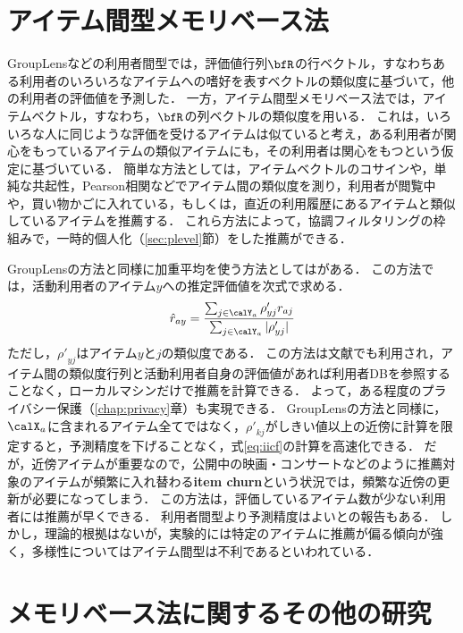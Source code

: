 \section{アイテム間型メモリベース法}
\label{sec:item-item}

GroupLensなどの利用者間型では，評価値行列$\bfR$の行ベクトル，すなわちある利用者のいろいろなアイテムへの嗜好を表すベクトルの類似度に基づいて，他の利用者の評価値を予測した．
一方，アイテム間型メモリベース法では，アイテムベクトル，すなわち，$\bfR$の列ベクトルの類似度を用いる．
これは，いろいろな人に同じような評価を受けるアイテムは似ていると考え，ある利用者が関心をもっているアイテムの類似アイテムにも，その利用者は関心をもつという仮定に基づいている．
簡単な方法としては，アイテムベクトルのコサイン\cite{ieeem:03:01}や，単純な共起性\cite{www:07:01}，Pearson相関などでアイテム間の類似度を測り，利用者が閲覧中や，買い物かごに入れている，もしくは，直近の利用履歴にあるアイテムと類似しているアイテムを推薦する．
これら方法によって，協調フィルタリングの枠組みで，一時的個人化（\ref{sec:plevel}節）をした推薦ができる．

GroupLensの方法と同様に加重平均を使う方法としては\cite{www:01:02}がある．
この方法では，活動利用者のアイテム$y$への推定評価値を次式で求める．
\begin{equation}
\hat{r}_{ay}=
\frac{\sum_{j\in\calY_a}\rho'_{yj}r_{aj}}{\sum_{j\in\calY_a}|\rho'_{yj}|}
\label{eq:iicf}
\end{equation}
ただし，${\rho'}_{yj}$はアイテム$y$と$j$の類似度である．
この方法は文献\cite{kdd:04:11}でも利用され，アイテム間の類似度行列と活動利用者自身の評価値があれば利用者DBを参照することなく，ローカルマシンだけで推薦を計算できる．
よって，ある程度のプライバシー保護（\ref{chap:privacy}章）も実現できる．
GroupLensの方法と同様に，$\calX_a$に含まれるアイテム全てではなく，${\rho'}_{kj}$がしきい値以上の近傍に計算を限定すると，予測精度を下げることなく，式\eqref{eq:iicf}の計算を高速化できる．
だが，近傍アイテムが重要なので，公開中の映画・コンサートなどのように推薦対象のアイテムが頻繁に入れ替わる\textbf{item churn}という状況では，頻繁な近傍の更新が必要になってしまう．
この方法は，評価しているアイテム数が少ない利用者には推薦が早くできる．
利用者間型より予測精度はよいとの報告もある．
しかし，理論的根拠はないが，実験的には特定のアイテムに推薦が偏る傾向が強く\cite{sigchi:06:01}，多様性についてはアイテム間型は不利であるといわれている．

\section{メモリベース法に関するその他の研究}
\label{sec:other-memory-based}

